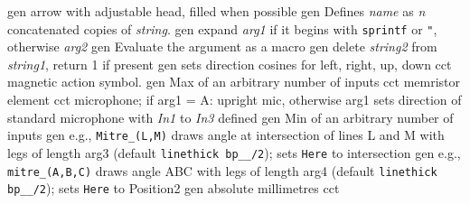 %

%
  {gen}%
  {arrow with adjustable head, filled when possible}%
%
  {gen}%
  {Defines {\sl name} as {\sl n} concatenated copies of {\sl
  string}.}%
%
  {gen}%
  {expand {\sl arg1} if it begins
    with {\tt sprintf} or {\tt "}, otherwise {\sl arg2}}%
%
  {gen}%
  {Evaluate the argument as a macro}%
%
  {gen}%
  {delete {\sl string2} from {\sl string1}, return 1 if present}%
%
  {gen}%
  {sets direction cosines for left, right, up, down}%
%
  {cct}%
  {magnetic action symbol.}%
%
  {gen}%
  {Max of an arbitrary number of inputs}%
%
  {cct}%
  {memristor element}%
%
  {cct}%
  {microphone; if arg1 = A: upright mic, otherwise arg1 sets direction
   of standard microphone with {\sl In1} to {\sl In3} defined
   }%
%
  {gen}%
  {Min of an arbitrary number of inputs}%
%
  {gen}%
  {e.g., {\tt Mitre\_(L,M)} draws angle at intersection of lines
   L and M with legs of length arg3 (default {\tt linethick bp\_\_/2});
   sets {\tt Here} to intersection
    }%
%
  {gen}%
  {e.g., {\tt mitre\_(A,B,C)} draws angle ABC with legs
   of length arg4 (default {\tt linethick bp\_\_/2}); sets {\tt Here}
   to Position2
    }%
%
  {gen}%
  {absolute millimetres}%
%
  {cct}%
